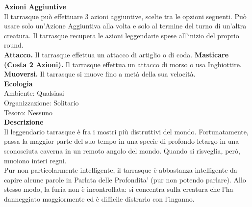 \begin{multicols}{2}
\textbf{Azioni Aggiuntive}\\
Il tarrasque può effettuare 3 azioni aggiuntive, scelte tra le opzioni seguenti. Può usare solo un'Azione Aggiuntiva alla volta e solo al termine del turno di un'altra creatura. Il tarrasque recupera le azioni leggendarie spese all'inizio del proprio round.\\
\textbf{Attacco.} Il tarrasque effettua un attacco di artiglio o di coda. \textbf{Masticare (Costa 2 Azioni).} Il tarrasque effettua un attacco di morso o usa Inghiottire.\\
\textbf{Muoversi.} Il tarrasque si muove fino a metà della sua velocità.\\
\textbf{Ecologia}\\
Ambiente: Qualsiasi\\
Organizzazione: Solitario\\
Tesoro: Nessuno\\
\textbf{Descrizione}\\
Il leggendario tarrasque è fra i mostri più distruttivi del mondo. Fortunatamente, passa la maggior parte del suo tempo in una specie di profondo letargo in una sconosciuta caverna in un remoto angolo del mondo. Quando si risveglia, però, muoiono interi regni.\\
Pur non particolarmente intelligente, il tarrasque è abbastanza intelligente da capire alcune parole in Parlata delle Profondita' (pur non potendo parlare). Allo stesso modo, la furia non è incontrollata: si concentra sulla creatura che l’ha danneggiato maggiormente ed è difficile distrarlo con l’inganno.\\


\end{multicols}
